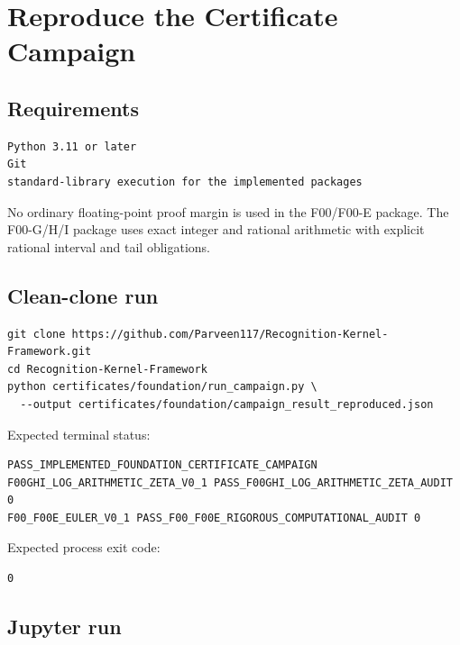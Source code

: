 \hypertarget{reproduce-the-certificate-campaign}{%
\chapter{Reproduce the Certificate Campaign}\label{reproduce-the-certificate-campaign}}

\hypertarget{requirements}{%
\section{Requirements}\label{requirements}}

\begin{verbatim}
Python 3.11 or later
Git
standard-library execution for the implemented packages
\end{verbatim}

No ordinary floating-point proof margin is used in the F00/F00-E package. The F00-G/H/I package uses exact integer and rational arithmetic with explicit rational interval and tail obligations.

\hypertarget{clean-clone-run}{%
\section{Clean-clone run}\label{clean-clone-run}}

\begin{verbatim}
git clone https://github.com/Parveen117/Recognition-Kernel-Framework.git
cd Recognition-Kernel-Framework
python certificates/foundation/run_campaign.py \
  --output certificates/foundation/campaign_result_reproduced.json
\end{verbatim}

Expected terminal status:

\begin{verbatim}
PASS_IMPLEMENTED_FOUNDATION_CERTIFICATE_CAMPAIGN
F00GHI_LOG_ARITHMETIC_ZETA_V0_1 PASS_F00GHI_LOG_ARITHMETIC_ZETA_AUDIT 0
F00_F00E_EULER_V0_1 PASS_F00_F00E_RIGOROUS_COMPUTATIONAL_AUDIT 0
\end{verbatim}

Expected process exit code:

\begin{verbatim}
0
\end{verbatim}

\hypertarget{jupyter-run}{%
\section{Jupyter run}\label{jupyter-run}}

